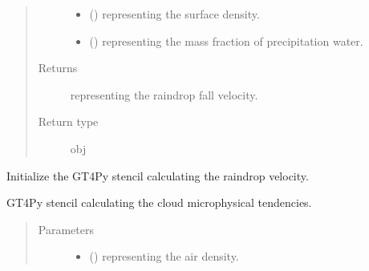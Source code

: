 \documentclass[letterpaper,10pt,english]{sphinxmanual}
\begin{document}
\begin{fulllineitems}
\begin{fulllineitems}
\begin{quote}
\begin{description}
\begin{itemize}
\item {} 
 () \textendash{}  representing the surface density.

\item {} 
 () \textendash{}  representing the mass fraction of precipitation water.

\end{itemize}

\item[{Returns}] \leavevmode
{} representing the raindrop fall velocity.

\item[{Return type}] \leavevmode
obj

\end{description}\end{quote}

\end{fulllineitems}


\begin{fulllineitems}
\label{\detokenize{api:tasmania.parameterizations.slow_tendency_microphysics_kessler_wrf.SlowTendencyMicrophysicsKesslerWRF._stencil_raindrop_fall_velocity_initialize}}
Initialize the GT4Py stencil calculating the raindrop velocity.

\end{fulllineitems}


\begin{fulllineitems}
\label{\detokenize{api:tasmania.parameterizations.slow_tendency_microphysics_kessler_wrf.SlowTendencyMicrophysicsKesslerWRF._stencil_tendency_defs}}
GT4Py stencil calculating the cloud microphysical tendencies.
\begin{quote}\begin{description}
\item[{Parameters}] \leavevmode\begin{itemize}
\item {} 
 () \textendash{}  representing the air density.


\end{itemize}
\end{description}
\end{quote}
\end{fulllineitems}
\end{fulllineitems}
\end{document}
